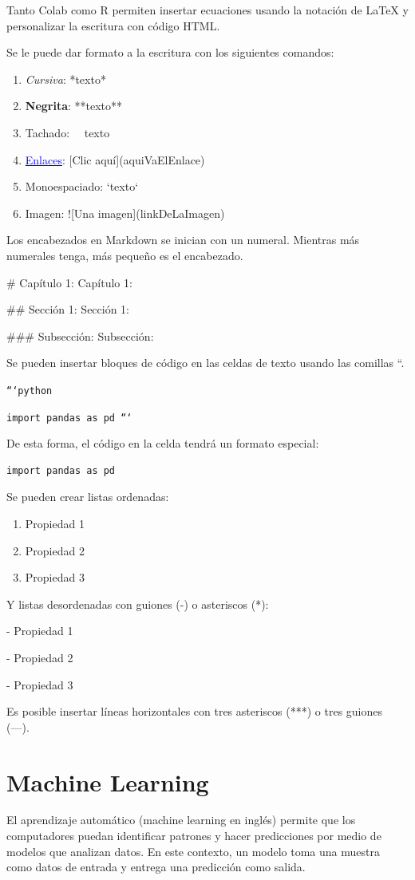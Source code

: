 \documentclass[a4paper, 12pt]{book}
\begin{document}
Tanto Colab como R permiten insertar ecuaciones usando la notación de LaTeX y personalizar la escritura con código HTML.


Se le puede dar formato a la escritura con los siguientes comandos:
\begin{enumerate}
	\item \textit{Cursiva}: *texto*
	\item \textbf{Negrita}: **texto**
	\item Tachado: ~~texto~~
	\item \textcolor{blue}{\underline{Enlaces}}: [Clic aquí](aquiVaElEnlace)
	\item Monoespaciado: `texto`
	\item Imagen: ![Una imagen](linkDeLaImagen)
\end{enumerate}

Los encabezados en Markdown se inician con un numeral. Mientras más numerales tenga, más pequeño es el encabezado.

$\#$ Capítulo 1: {\LARGE Capítulo 1:}

$\#\#$ Sección 1: {\Large Sección 1:}

$\#\#\#$ Subsección: {\large Subsección:}

Se pueden insertar bloques de código en las celdas de texto usando las comillas ``.

\texttt{```python}
	
\texttt{import pandas as pd
	```}

De esta forma, el código en la celda tendrá un formato especial:
\begin{verbatim}
import pandas as pd
\end{verbatim}


Se pueden crear listas ordenadas:
\begin{enumerate}
	\item Propiedad 1
	\item Propiedad 2
	\item Propiedad 3
\end{enumerate}
Y listas desordenadas con guiones (-) o asteriscos (*):

- Propiedad 1

- Propiedad 2

- Propiedad 3


Es posible insertar líneas horizontales con tres asteriscos (***) o tres guiones (---).

%
\chapter{Machine Learning}
El aprendizaje automático (machine learning en inglés) permite que los computadores puedan identificar patrones y hacer predicciones por medio de modelos que analizan datos. En este contexto, un modelo toma una muestra como datos de entrada y entrega una predicción como salida.
\end{document}
